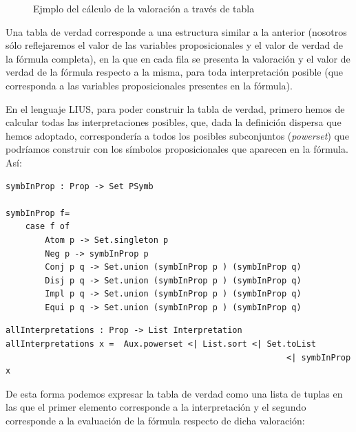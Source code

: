 \documentclass[a4paper]{report}
\begin{document}
\begin{figure}[H]
\centering
{}
\caption{Ejmplo del cálculo de la valoración a través de tabla}
\end{figure}

Una tabla de verdad corresponde a una estructura similar a la anterior (nosotros sólo reflejaremos el valor de las variables proposicionales y el valor de verdad de la fórmula completa), en la que en cada fila se presenta la valoración y el valor de verdad de la fórmula respecto a la misma, para toda interpretación posible (que corresponda a las variables proposicionales presentes en la fórmula).

En el lenguaje LIUS, para poder construir la tabla de verdad, primero hemos de calcular todas las interpretaciones posibles, que, dada la definición dispersa que hemos adoptado, correspondería a todos los posibles subconjuntos (\textit{powerset}) que podríamos construir con los símbolos proposicionales que aparecen en la fórmula. Así:\\

\begin{lstlisting}[caption= {Función para extraer los símbolos proposicionales que intervienen en una fórmula}]
symbInProp : Prop -> Set PSymb

symbInProp f=
    case f of
        Atom p -> Set.singleton p
        Neg p -> symbInProp p
        Conj p q -> Set.union (symbInProp p ) (symbInProp q)
        Disj p q -> Set.union (symbInProp p ) (symbInProp q)
        Impl p q -> Set.union (symbInProp p ) (symbInProp q)
        Equi p q -> Set.union (symbInProp p ) (symbInProp q)
\end{lstlisting}

\begin{lstlisting}[caption= {Función para extraer las posibles interpretaciones para una fórmula propsicional}]
allInterpretations : Prop -> List Interpretation
allInterpretations x =  Aux.powerset <| List.sort <| Set.toList 
                                                         <| symbInProp x
\end{lstlisting}

De esta forma podemos expresar la tabla de verdad como una lista de tuplas en las que el primer elemento corresponde a la interpretación y el segundo corresponde a la evaluación de la fórmula respecto de dicha valoración:\\
\end{document}
